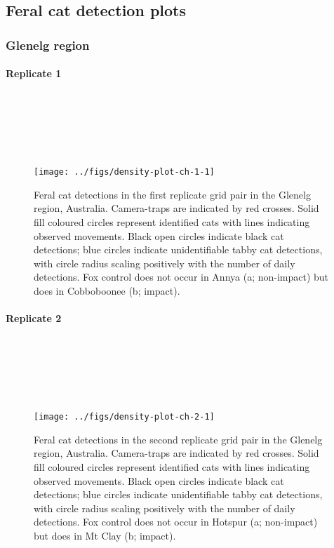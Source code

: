 \documentclass[preprint, 3p, authoryear]{elsarticle} %
\begin{document}
\newpage

\hypertarget{feral-cat-detection-plots}{%
\subsection{Feral cat detection plots}\label{feral-cat-detection-plots}}

\hypertarget{glenelg-region-1}{%
\subsubsection{Glenelg region}\label{glenelg-region-1}}

\hypertarget{replicate-1}{%
\paragraph{Replicate 1}\label{replicate-1}}

\(~\)

\(~\)

\(~\)

\begin{figure}

{\centering \texttt{[image: ../figs/density-plot-ch-1-1]} 

}

\caption{Feral cat detections in the first replicate grid pair in the Glenelg region, Australia. Camera-traps are indicated by red crosses. Solid fill coloured circles represent identified cats with lines indicating observed movements. Black open circles indicate black cat detections; blue circles indicate unidentifiable tabby cat detections, with circle radius scaling positively with the number of daily detections. Fox control does not occur in Annya (a; non-impact) but does in Cobboboonee (b; impact).}\label{fig:density-plot-ch-1}
\end{figure}

\newpage

\hypertarget{replicate-2}{%
\paragraph{Replicate 2}\label{replicate-2}}

\(~\)

\(~\)

\(~\)

\begin{figure}

{\centering \texttt{[image: ../figs/density-plot-ch-2-1]} 

}

\caption{Feral cat detections in the second replicate grid pair in the Glenelg region, Australia. Camera-traps are indicated by red crosses. Solid fill coloured circles represent identified cats with lines indicating observed movements. Black open circles indicate black cat detections; blue circles indicate unidentifiable tabby cat detections, with circle radius scaling positively with the number of daily detections. Fox control does not occur in Hotspur (a; non-impact) but does in Mt Clay (b; impact).}\label{fig:density-plot-ch-2}
\end{figure}
\end{document}
